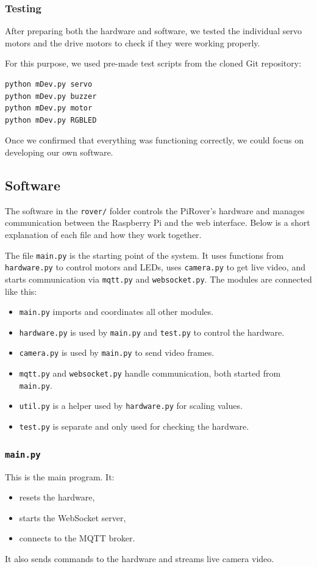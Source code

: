 \subsubsection{Testing}
After preparing both the hardware and software, we tested the individual servo motors and the drive motors to check if they were working properly.

For this purpose, we used pre-made test scripts from the cloned Git repository:
\begin{verbatim}
python mDev.py servo
python mDev.py buzzer
python mDev.py motor
python mDev.py RGBLED
\end{verbatim}

Once we confirmed that everything was functioning correctly, we could focus on developing our own software.


\subsection{Software}

The software in the \texttt{rover/} folder controls the PiRover's hardware and manages communication between the Raspberry Pi and the web interface. Below is a short explanation of each file and how they work together.

The file \texttt{main.py} is the starting point of the system. It uses functions from \texttt{hardware.py} to control motors and LEDs, uses \texttt{camera.py} to get live video, and starts communication via \texttt{mqtt.py} and \texttt{websocket.py}.
The modules are connected like this:
\begin{itemize}
    \item \texttt{main.py} imports and coordinates all other modules.
    \item \texttt{hardware.py} is used by \texttt{main.py} and \texttt{test.py} to control the hardware.
    \item \texttt{camera.py} is used by \texttt{main.py} to send video frames.
    \item \texttt{mqtt.py} and \texttt{websocket.py} handle communication, both started from \texttt{main.py}.
    \item \texttt{util.py} is a helper used by \texttt{hardware.py} for scaling values.
    \item \texttt{test.py} is separate and only used for checking the hardware.
\end{itemize}

\subsubsection*{\texttt{main.py}}
This is the main program. It:
\begin{itemize}
    \item resets the hardware,
    \item starts the WebSocket server,
    \item connects to the MQTT broker.
\end{itemize}
It also sends commands to the hardware and streams live camera video.

